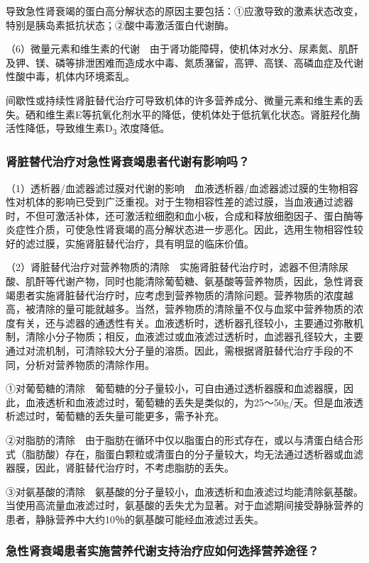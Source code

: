 导致急性肾衰竭的蛋白高分解状态的原因主要包括：①应激导致的激素状态改变，特别是胰岛素抵抗状态；②酸中毒激活蛋白代谢酶。

（6）微量元素和维生素的代谢　由于肾功能障碍，使机体对水分、尿素氮、肌酐及钾、镁、磷等排泄困难而造成水中毒、氮质潴留，高钾、高镁、高磷血症及代谢性酸中毒，机体内环境紊乱。

间歇性或持续性肾脏替代治疗可导致机体的许多营养成分、微量元素和维生素的丢失。硒和维生素E等抗氧化剂水平的降低，使机体处于低抗氧化状态。肾脏羟化酶活性降低，导致维生素D\textsubscript{3}
浓度降低。

\subsubsection{肾脏替代治疗对急性肾衰竭患者代谢有影响吗？}

（1）透析器/血滤器滤过膜对代谢的影响　血液透析器/血滤器滤过膜的生物相容性对机体的影响已受到广泛重视。对于生物相容性差的滤过膜，当血液通过滤器时，不但可激活补体，还可激活粒细胞和血小板，合成和释放细胞因子、蛋白酶等炎症性介质，可使急性肾衰竭的高分解状态进一步恶化。因此，选用生物相容性较好的滤过膜，实施肾脏替代治疗，具有明显的临床价值。

（2）肾脏替代治疗对营养物质的清除　实施肾脏替代治疗时，滤器不但清除尿酸、肌酐等代谢产物，同时也能清除葡萄糖、氨基酸等营养物质，因此，急性肾衰竭患者实施肾脏替代治疗时，应考虑到营养物质的清除问题。营养物质的浓度越高，被清除的量可能就越多。当然，营养物质的清除量不仅与血浆中营养物质的浓度有关，还与滤器的通透性有关。血液透析时，透析器孔径较小，主要通过弥散机制，清除小分子物质；相反，血液滤过或血液滤过透析时，血滤器孔径较大，主要通过对流机制，可清除较大分子量的溶质。因此，需根据肾脏替代治疗手段的不同，分析对营养物质的清除作用。

①对葡萄糖的清除　葡萄糖的分子量较小，可自由通过透析器膜和血滤器膜，因此，血液透析和血液滤过时，葡萄糖的丢失是类似的，为25～50g/天。但是血液透析滤过时，葡萄糖的丢失量可能更多，需予补充。

②对脂肪的清除　由于脂肪在循环中仅以脂蛋白的形式存在，或以与清蛋白结合形式（脂肪酸）存在，脂蛋白颗粒或清蛋白的分子量较大，均无法通过透析器或血滤器膜，因此，肾脏替代治疗时，不考虑脂肪的丢失。

③对氨基酸的清除　氨基酸的分子量较小，血液透析和血液滤过均能清除氨基酸。当使用高流量血液滤过时，氨基酸的丢失尤为显著。对于血滤期间接受静脉营养的患者，静脉营养中大约10％的氨基酸可能经血液滤过丢失。

\subsubsection{急性肾衰竭患者实施营养代谢支持治疗应如何选择营养途径？}

